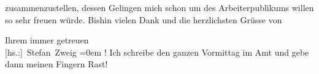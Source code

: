               zusammenzustellen, dessen Gelingen mich schon um des \label{K_L03683-3v}\label{K_L03683-3} Arbeiterpublikums willen so sehr freuen würde. Bishin
               vielen Dank und die herzlichsten Grüsse von\pend
           
\pstart
           Ihrem immer getreuen{\\[\baselineskip]}\spacefill\mbox{{[}hs.:{]} Stefan Zweig}\pend
           \leftskip=0em{}
\pstart
           \noindent{}\label{K_L03683-4v}\label{K_L03683-4}! Ich schreibe den ganzen Vormittag im Amt und
                  gebe dann meinen Fingern Rast!\pend
           \endnumbering{}  \newcommand{\dateiname}{L03683}\newcommand{\titel}{Stefan Zweig an Arthur Schnitzler, 3. 12. 1914}\newcommand{\editorInnen}{Selma Jahnke und Martin Anton Müller}
